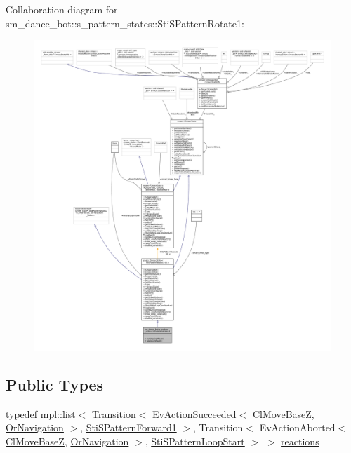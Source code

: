 Collaboration diagram for sm\+\_\+dance\+\_\+bot\+:\+:s\+\_\+pattern\+\_\+states\+:\+:Sti\+S\+Pattern\+Rotate1\+:
\nopagebreak
\begin{figure}[H]
\begin{center}
\leavevmode
\includegraphics[width=350pt]{structsm__dance__bot_1_1s__pattern__states_1_1StiSPatternRotate1__coll__graph}
\end{center}
\end{figure}
\subsection*{Public Types}
\begin{DoxyCompactItemize}
\item 
typedef mpl\+::list$<$ Transition$<$ Ev\+Action\+Succeeded$<$ \hyperlink{classcl__move__base__z_1_1ClMoveBaseZ}{Cl\+Move\+BaseZ}, \hyperlink{classsm__dance__bot_1_1OrNavigation}{Or\+Navigation} $>$, \hyperlink{structsm__dance__bot_1_1s__pattern__states_1_1StiSPatternForward1}{Sti\+S\+Pattern\+Forward1} $>$, Transition$<$ Ev\+Action\+Aborted$<$ \hyperlink{classcl__move__base__z_1_1ClMoveBaseZ}{Cl\+Move\+BaseZ}, \hyperlink{classsm__dance__bot_1_1OrNavigation}{Or\+Navigation} $>$, \hyperlink{structsm__dance__bot_1_1s__pattern__states_1_1StiSPatternLoopStart}{Sti\+S\+Pattern\+Loop\+Start} $>$ $>$ \hyperlink{structsm__dance__bot_1_1s__pattern__states_1_1StiSPatternRotate1_a0d9e39c0154f6ae391fe6982e699ebdd}{reactions}
\end{DoxyCompactItemize}
